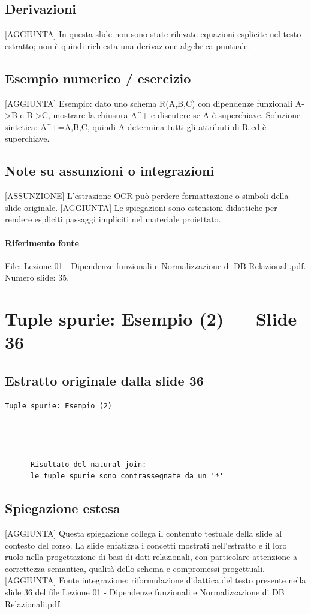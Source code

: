 \documentclass[11pt]{article}
\begin{document}
\subsection*{Derivazioni}
[AGGIUNTA] In questa slide non sono state rilevate equazioni esplicite nel testo estratto; non è quindi richiesta una derivazione algebrica puntuale.
\subsection*{Esempio numerico / esercizio}
[AGGIUNTA] Esempio: dato uno schema R(A,B,C) con dipendenze funzionali A->B e B->C, mostrare la chiusura A^+ e discutere se A è superchiave. Soluzione sintetica: A^+={A,B,C}, quindi A determina tutti gli attributi di R ed è superchiave.
\subsection*{Note su assunzioni o integrazioni}
[ASSUNZIONE] L'estrazione OCR può perdere formattazione o simboli della slide originale.
[AGGIUNTA] Le spiegazioni sono estensioni didattiche per rendere espliciti passaggi impliciti nel materiale proiettato.
\paragraph{Riferimento fonte} File: Lezione 01 - Dipendenze funzionali e Normalizzazione di DB Relazionali.pdf. Numero slide: 35.
\section{Tuple spurie: Esempio (2) --- Slide 36}
\subsection*{Estratto originale dalla slide 36}
\begin{lstlisting}
Tuple spurie: Esempio (2)




      Risultato del natural join:
      le tuple spurie sono contrassegnate da un '*'
\end{lstlisting}
\subsection*{Spiegazione estesa}
[AGGIUNTA] Questa spiegazione collega il contenuto testuale della slide al contesto del corso. La slide enfatizza i concetti mostrati nell'estratto e il loro ruolo nella progettazione di basi di dati relazionali, con particolare attenzione a correttezza semantica, qualità dello schema e compromessi progettuali.
[AGGIUNTA] Fonte integrazione: riformulazione didattica del testo presente nella slide 36 del file Lezione 01 - Dipendenze funzionali e Normalizzazione di DB Relazionali.pdf.
\end{document}
